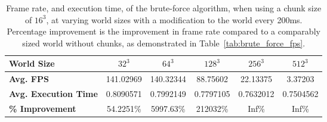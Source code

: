 \begin{table}[h!]
    \centering
    \vspace{0.5em}
    \begin{tabular}{l|*{5}{c}}
        \toprule
        \textbf{World Size}          & \textbf{\(32^3\)} & \textbf{\(64^3\)} & \textbf{\(128^3\)} & \textbf{\(256^3\)} & \textbf{\(512^3\)} \\
        \midrule
        \textbf{Avg. FPS}            & 141.02969         & 140.32344         & 88.75602           & 22.13375           & 3.37203            \\
        \textbf{Avg. Execution Time} & 0.8090571         & 0.7992149         & 0.7797105          & 0.7632012          & 0.7504562          \\
        \textbf{\% Improvement}      & 54.2251\%         & 5997.63\%         & 212032\%           & Inf\%              & Inf\%              \\
        \bottomrule
    \end{tabular}
    \caption{Frame rate, and execution time, of the brute-force algorithm, when using a chunk size of \(16^3\), at
        varying world sizes with a modification to the world every 200ms. Percentage improvement is the improvement in
        frame rate compared to a comparably sized world without chunks, as demonstrated in Table~\ref{tab:brute_force_fps}.}
\end{table}
